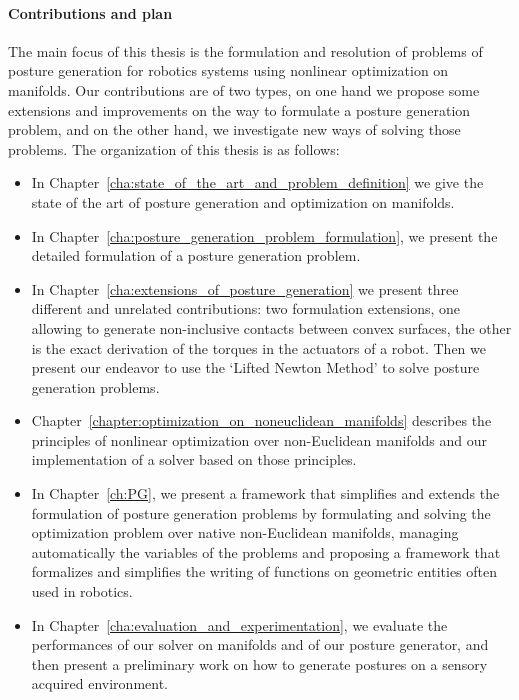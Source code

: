 \paragraph{Contributions and plan}
The main focus of this thesis is the formulation and resolution of problems of posture generation for robotics systems using nonlinear optimization on manifolds.
Our contributions are of two types, on one hand we propose some extensions and improvements on the way to formulate a posture generation problem, and on the other hand, we investigate new ways of solving those problems.
The organization of this thesis is as follows:
\begin{itemize}
  \item In Chapter~\ref{cha:state_of_the_art_and_problem_definition} we give the state of the art of posture generation and optimization on manifolds.
  \item In Chapter~\ref{cha:posture_generation_problem_formulation}, we present the detailed formulation of a posture generation problem.
  \item In Chapter~\ref{cha:extensions_of_posture_generation} we present three different and unrelated contributions: two formulation extensions, one allowing to generate non-inclusive contacts between convex surfaces, the other is the exact derivation of the torques in the actuators of a robot.
  Then we present our endeavor to use the `Lifted Newton Method' to solve posture generation problems.
  \item Chapter~\ref{chapter:optimization_on_noneuclidean_manifolds} describes the principles of nonlinear optimization over non-Euclidean manifolds and our implementation of a solver based on those principles.
  \item In Chapter~\ref{ch:PG}, we present a framework that simplifies and extends the formulation of posture generation problems by formulating and solving the optimization problem over native non-Euclidean manifolds, managing automatically the variables of the problems and proposing a framework that formalizes and simplifies the writing of functions on geometric entities often used in robotics.
  \item In Chapter~\ref{cha:evaluation_and_experimentation}, we evaluate the performances of our solver on manifolds and of our posture generator, and then present a preliminary work on how to generate postures on a sensory acquired environment.
\end{itemize}


